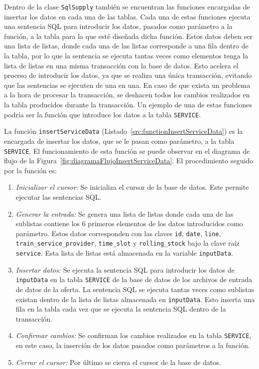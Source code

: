 Dentro de la clase \texttt{SqlSupply} también se encuentran las funciones encargadas de insertar los datos en cada una de las tablas. Cada una de estas funciones ejecuta una sentencia \acrshort{SQL} para introducir los datos, pasados como parámetro a la función, a la tabla para la que esté diseñada dicha función. Estos datos deben ser una lista de listas, donde cada una de las listas corresponde a una fila dentro de la tabla, por lo que la sentencia se ejecuta tantas veces como elementos tenga la lista de listas en una misma transacción con la base de datos. Esto acelera el proceso de introducir los datos, ya que se realiza una única transacción, evitando que las sentencias se ejecuten de una en una. En caso de que exista un problema a la hora de procesar la transacción, se deshacen todos los cambios realizados en la tabla producidos durante la transacción. Un ejemplo de una de estas funciones podría ser la función que introduce los datos a la tabla \texttt{SERVICE}.

La función \texttt{insertServiceData} (Listado~\ref{src:functionInsertServiceData}) es la encargada de insertar los datos, que se le pasan como parámetro, a la tabla \texttt{SERVICE}. El funcionamiento de esta función se puede observar en el diagrama de flujo de la Figura~\ref{fig:diagramaFlujoInsertServiceData}. El procedimiento seguido por la función es:
    \begin{enumerate}
        \item \textit{Inicializar el cursor:} Se inicializa el cursor de la base de datos. Este permite ejecutar las sentencias \acrshort{SQL}.
        
        \item \textit{Generar la entrada:} Se genera una lista de listas donde cada una de las sublistas contiene los 6 primeros elementos de los datos introducidos como parámetro. Estos datos corresponden con las claves \texttt{id}, \texttt{date}, \texttt{line}, \texttt{train\_service\_provider}, \texttt{time\_slot} y \texttt{rolling\_stock} bajo la clave raíz \texttt{service}. Esta lista de listas está almacenada en la variable \texttt{inputData}.
        
        \item \textit{Insertar datos:} Se ejecuta la sentencia \acrshort{SQL} para introducir los datos de \texttt{inputData} en la tabla \texttt{SERVICE} de la base de datos de los archivos de entrada de datos de la oferta. La sentencia \acrshort{SQL} se ejecuta tantas veces como sublistas existan dentro de la lista de listas almacenada en \texttt{inputData}. Esto inserta una fila en la tabla cada vez que se ejecuta la sentencia \acrshort{SQL} dentro de la transacción.

        \item \textit{Confirmar cambios:} Se confirman los cambios realizados en la tabla \texttt{SERVICE}, en este caso, la inserción de los datos pasados como parámetros a la función.
        
        \item \textit{Cerrar el cursor:} Por último se cierra el cursor de la base de datos.
    \end{enumerate}

